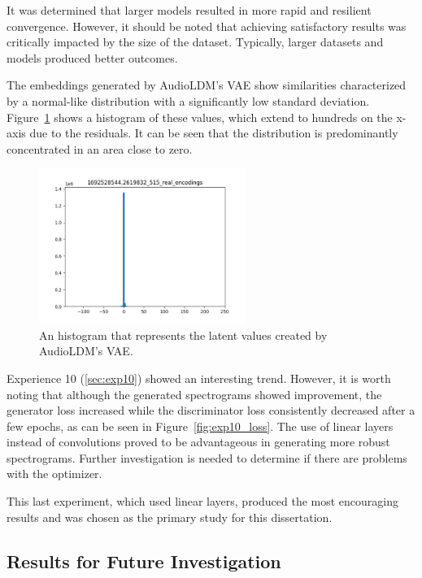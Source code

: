 It was determined that larger models resulted in more rapid and resilient convergence. However, it should be noted that achieving satisfactory results was critically impacted by the size of the dataset. Typically, larger datasets and models produced better outcomes.

The embeddings generated by AudioLDM's \ac{VAE} show similarities characterized by a normal-like distribution with a significantly low standard deviation. Figure~\ref{fig:original-latents-hist} shows a histogram of these values, which extend to hundreds on the x-axis due to the residuals. It can be seen that the distribution is predominantly concentrated in an area close to zero.

\begin{figure}[ht]
    \centering
    \includegraphics[width=0.6\textwidth]{figures/4.5-results/real_distribution.png}
    \caption{An histogram that represents the latent values created by AudioLDM's \ac{VAE}.}
    \label{fig:original-latents-hist}
\end{figure}

Experience 10 (\ref{sec:exp10}) showed an interesting trend. However, it is worth noting that although the generated spectrograms showed improvement, the generator loss increased while the discriminator loss consistently decreased after a few epochs, as can be seen in Figure~\ref{fig:exp10_loss}. The use of linear layers instead of convolutions proved to be advantageous in generating more robust spectrograms. Further investigation is needed to determine if there are problems with the optimizer.

This last experiment, which used linear layers, produced the most encouraging results and was chosen as the primary study for this dissertation.

\subsection{Results for Future Investigation}

